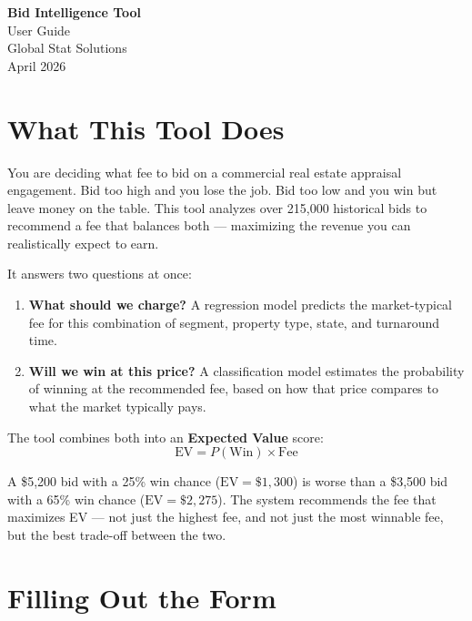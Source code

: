 \documentclass[12pt,a4paper]{article}
\newcommand{\term}[1]{\textbf{#1}}
\newcommand{\ev}{\text{EV}}
\begin{document}
\begin{center}
    {\LARGE\bfseries\color{gssblue} Bid Intelligence Tool}\\[0.3em]
    {\Large User Guide}\\[1em]
    {\large Global Stat Solutions}\\[0.3em]
    {\small April 2026}
\end{center}

\vspace{1em}

\section{What This Tool Does}

You are deciding what fee to bid on a commercial real estate appraisal engagement.
Bid too high and you lose the job. Bid too low and you win but leave money on the table.
This tool analyzes over 215,000 historical bids to recommend a fee that balances both ---
maximizing the revenue you can realistically expect to earn.

It answers two questions at once:

\begin{enumerate}[leftmargin=2em]
    \item \term{What should we charge?} A regression model predicts the market-typical fee
          for this combination of segment, property type, state, and turnaround time.
    \item \term{Will we win at this price?} A classification model estimates the probability
          of winning at the recommended fee, based on how that price compares to what the
          market typically pays.
\end{enumerate}

The tool combines both into an \term{Expected Value} score:
\[
    \ev = P(\text{Win}) \times \text{Fee}
\]

A \$5,200 bid with a 25\% win chance ($\ev = \$1{,}300$) is worse than a \$3,500 bid
with a 65\% win chance ($\ev = \$2{,}275$). The system recommends the fee that maximizes
EV --- not just the highest fee, and not just the most winnable fee, but the best
trade-off between the two.

\section{Filling Out the Form}
\end{document}

